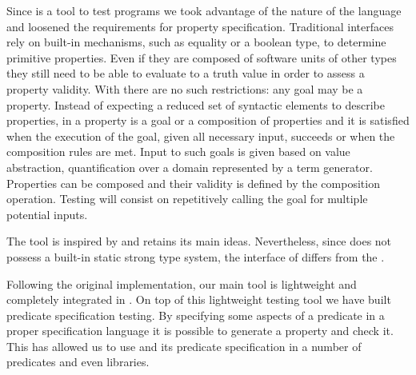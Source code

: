 Since \plqc{} is a tool to test \Prolog{} programs we took advantage of
the nature of the language and loosened the requirements for property
specification.
%
Traditional interfaces rely on built-in mechanisms, such as equality or
a boolean type, to determine primitive properties.
%
Even if they are composed of software units of other types they still
need to be able to evaluate to a truth value in order to assess a
property validity.
%
With \Prolog{} there are no such restrictions: any goal may be a property.
%
Instead of expecting a reduced set of syntactic elements to describe
properties, in \plqc{} a property is a goal or a composition of
properties and it is satisfied when the execution of the goal, given all
necessary input, succeeds or when the composition rules are met.
%
Input to such goals is given based on \plqc{} value abstraction,
quantification over a domain represented by a term generator.
%
Properties can be composed and their validity is defined by the
composition operation.
%
Testing will consist on repetitively calling the goal for multiple
potential inputs.


The \plqc{} tool is inspired by \QuickCheck{} and retains its main
ideas.
%
%
Nevertheless, since \Prolog{} does not possess a built-in static strong
type system, the interface of \plqc{} differs from the \Haskell{}
\QuickCheck{}.


Following the original \QuickCheck{} implementation, our main tool is
lightweight and completely integrated in \Prolog{}.
%
On top of this lightweight testing tool we have built predicate
specification testing.
%
By specifying some aspects of a predicate in a proper specification
language it is possible to generate a \plqc{} property and check it.
%
This has allowed us to  use \plqc{} and its predicate specification in a number of
predicates and even libraries.






